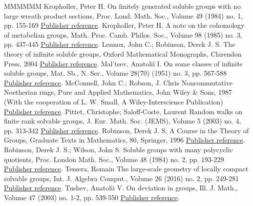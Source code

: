 \begin{thebibliography}{MMMMMM}
 Kropholler, Peter H. On finitely generated soluble groups with no large wreath product sections, Proc. Lond. Math. Soc., Volume 49 (1984) no. 1, pp. 155-169 \href{https://ahl.centre-mersenne.org/item/AHL_2020__3__981_0/#K84}{Publisher reference}.
 Kropholler, Peter H. A note on the cohomology of metabelian groups, Math. Proc. Camb. Philos. Soc., Volume 98 (1985) no. 3, pp. 437-445 \href{https://ahl.centre-mersenne.org/item/AHL_2020__3__981_0/#K2}{Publisher reference}.
 Lennox, John C.; Robinson, Derek J. S. The theory of infinite soluble groups, Oxford Mathematical Monographs, Clarendon Press, 2004 \href{https://ahl.centre-mersenne.org/item/AHL_2020__3__981_0/#LennoxRobinson}{Publisher reference}.
 Mal’tsev, Anatoliĭ I. On some classes of infinite soluble groups, Mat. Sb., N. Ser., Volume 28(70) (1951) no. 3, pp. 567-588 \href{https://ahl.centre-mersenne.org/item/AHL_2020__3__981_0/#Mal51}{Publisher reference}.
 McConnell, John C.; Robson, J. Chris Noncommutative Noetherian rings, Pure and Applied Mathematics, John Wiley \& Sons, 1987 (With the cooperation of L. W. Small, A Wiley-Interscience Publication) \href{https://ahl.centre-mersenne.org/item/AHL_2020__3__981_0/#MR}{Publisher reference}.
 Pittet, Christophe; Saloff-Coste, Laurent Random walks on finite rank solvable groups, J. Eur. Math. Soc. (JEMS), Volume 5 (2003) no. 4, pp. 313-342 \href{https://ahl.centre-mersenne.org/item/AHL_2020__3__981_0/#PSC03}{Publisher reference}.
 Robinson, Derek J. S. A Course in the Theory of Groups, Graduate Texts in Mathematics, 80, Springer, 1996 \href{https://ahl.centre-mersenne.org/item/AHL_2020__3__981_0/#Rob96}{Publisher reference}.
 Robinson, Derek J. S.; Wilson, John S. Soluble groups with many polycyclic quotients, Proc. London Math. Soc., Volume 48 (1984) no. 2, pp. 193-229 \href{https://ahl.centre-mersenne.org/item/AHL_2020__3__981_0/#RW}{Publisher reference}.
 Tessera, Romain The large-scale geometry of locally compact solvable groups, Int. J. Algebra Comput., Volume 26 (2016) no. 2, pp. 249-281 \href{https://ahl.centre-mersenne.org/item/AHL_2020__3__981_0/#Tsurvey}{Publisher reference}.
 Tushev, Anatolii V. On deviation in groups, Ill. J. Math., Volume 47 (2003) no. 1-2, pp. 539-550 \href{https://ahl.centre-mersenne.org/item/AHL_2020__3__981_0/#Tus}{Publisher reference}.
\end{thebibliography}
